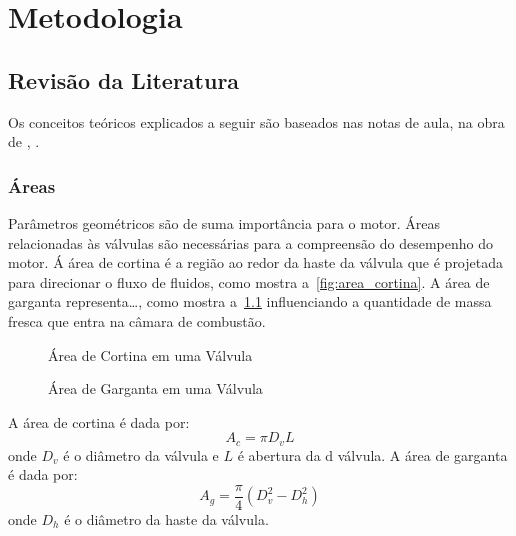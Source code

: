 \chapter{Metodologia}

\section{Revisão da Literatura}

Os conceitos teóricos explicados a seguir são baseados nas notas de aula, na obra de \textcite{heywood2018internal}, \textcite{ferguson2015internal}.

\subsection{Áreas}

Parâmetros geométricos são de suma importância para o motor. 
Áreas relacionadas às válvulas são necessárias para a compreensão do desempenho do motor.
Á área de cortina é a região ao redor da haste da válvula que é projetada para direcionar o fluxo de fluidos, como mostra a~\cref{fig:area_cortina}.
A área de garganta representa\ldots, como mostra a~\cref{fig:area_garganta} influenciando a quantidade de massa fresca que entra na câmara de combustão.


\begin{figure}[!htb]
    \centering
     \begin{minipage}{0.49\textwidth}
        \centering
        \caption{Área de Cortina em uma Válvula}
        
        \label{fig:area_cortina}
     \end{minipage}
     \hfill
     \begin{minipage}{0.49\textwidth}
        \centering
        \caption{Área de Garganta em uma Válvula}
        
        \label{fig:area_garganta}
     \end{minipage}
   \end{figure}

A área de cortina é dada por: 
%
\begin{equation}
    A_c = \pi D_v L
\end{equation}
%
onde $D_v$ é o diâmetro da válvula e $L$ é abertura da d válvula. A área de garganta é dada por:
%
\begin{equation}
    A_g = \frac{\pi}{4} \left(D^2_v - D^2_h\right)
\end{equation}
%
onde $D_h$ é o diâmetro da haste da válvula.
